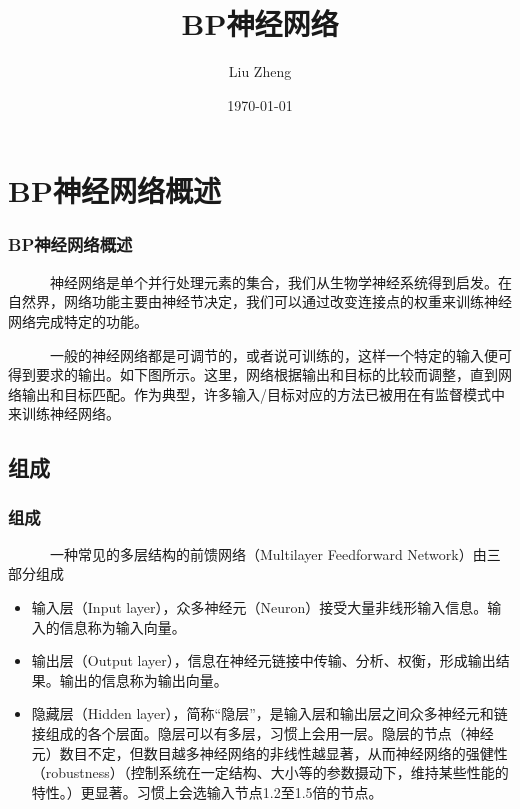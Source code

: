 \documentclass[slidestop,compress,mathserif,c]{beamer}
\title{BP神经网络}
\author{Liu Zheng}
\date{\today}
\institute{同济大学电信学院}
\begin{document}
\frame{\titlepage}
\AtBeginSection{
  \frame{\tableofcontents[sections={\thesection}]}
}
\section{BP神经网络概述}


\begin{frame}
\frametitle{BP神经网络概述}
~~~~~~神经网络是单个并行处理元素的集合，我们从生物学神经系统得到启发。在自然界，网络功能主要由神经节决定，我们可以通过改变连接点的权重来训练神经网络完成特定的功能。

~~~~~~一般的神经网络都是可调节的，或者说可训练的，这样一个特定的输入便可得到要求的输出。如下图所示。这里，网络根据输出和目标的比较而调整，直到网络输出和目标匹配。作为典型，许多输入/目标对应的方法已被用在有监督模式中来训练神经网络。 

\end{frame}

\subsection{组成}
\begin{frame}
\frametitle{组成}
~~~~~~一种常见的多层结构的前馈网络（Multilayer Feedforward Network）由三部分组成

\begin{itemize}
\item 输入层（Input layer），众多神经元（Neuron）接受大量非线形输入信息。输入的信息称为输入向量。
\item 输出层（Output layer），信息在神经元链接中传输、分析、权衡，形成输出结果。输出的信息称为输出向量。
\item 隐藏层（Hidden layer），简称“隐层”，是输入层和输出层之间众多神经元和链接组成的各个层面。隐层可以有多层，习惯上会用一层。隐层的节点（神经元）数目不定，但数目越多神经网络的非线性越显著，从而神经网络的强健性（robustness）（控制系统在一定结构、大小等的参数摄动下，维持某些性能的特性。）更显著。习惯上会选输入节点1.2至1.5倍的节点。
\end{itemize}
\end{frame}


\end{document}
